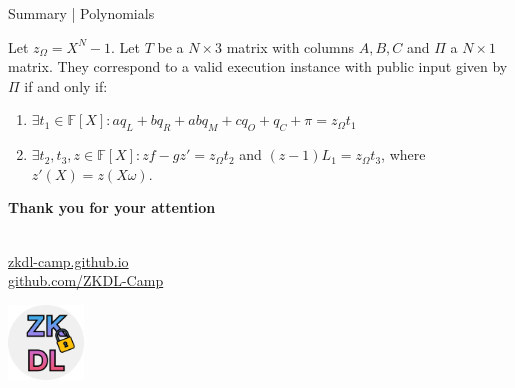 \documentclass{zkdl-presentation-template}
\begin{document}
    \begin{frame} {Summary | Polynomials}
        \begin{definition}
            Let $z_{\Omega} = X^N - 1$. Let $T$ be a $N \times 3$ matrix with columns $A, B,
            C$ and $\Pi$ a $N \times 1$ matrix. They correspond to a valid execution
            instance with public input given by $\Pi$ if and only if:
            
            \begin{enumerate}
                \item \(\exists t_1 \in \mathbb{F}[X]: aq_L + bq_R + abq_M + cq_O + q_C + \pi = z_{\Omega}t_1\)
                \item \(\exists t_2, t_3, z \in \mathbb{F}[X]: zf - gz' = z_{\Omega}t_2\) and \((z-1)L_1 = z_{\Omega}t_3\), where $z'(X) = z(X\omega)$.
            \end{enumerate}
        \end{definition}
    \end{frame}

    \begin{frame}
        \centering
        \LARGE
        \textbf{Thank you for your attention} \\

        \vspace{0.2cm} \Huge {} \large \\

        \vspace{1cm}

        \href{https://zkdl-camp.github.io/}{\hspace{.325em}zkdl-camp.github.io} \\

        \href{https://github.com/ZKDL-Camp}{\hspace{.325em}github.com/ZKDL-Camp}

        \begin{center}
            \includegraphics[width=0.15\textwidth]{images/logo.png}
        \end{center}
    \end{frame}
\end{document}

